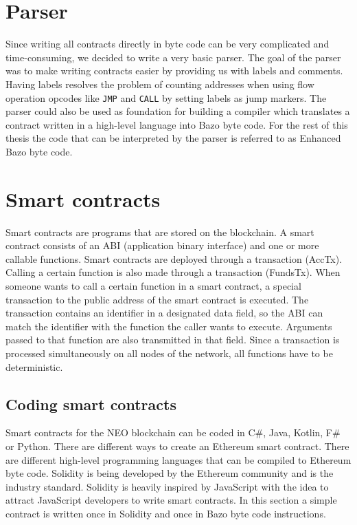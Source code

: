 \section{Parser}
Since writing all contracts directly in byte code can be very complicated and time-consuming, we decided to write a very basic parser. The goal of the parser was to make writing contracts easier by providing us with labels and comments. Having labels resolves the problem of counting addresses when using flow operation opcodes like \texttt{JMP} and \texttt{CALL} by setting labels as jump markers. The parser could also be used as foundation for building a compiler which translates a contract written in a high-level language into Bazo byte code. For the rest of this thesis the code that can be interpreted by the parser is referred to as \flqq Enhanced Bazo byte code\frqq.

\section{Smart contracts}
Smart contracts are programs that are stored on the blockchain. A smart contract consists of an ABI (application binary interface) and one or more callable functions. Smart contracts are deployed through a transaction (AccTx). Calling a certain function is also made through a transaction (FundsTx). When someone wants to call a certain function in a smart contract, a special transaction to the public address of the smart contract is executed. The transaction contains an identifier in a designated data field, so the ABI can match the identifier with the function the caller wants to execute. Arguments passed to that function are also transmitted in that field. Since a transaction is processed simultaneously on all nodes of the network, all functions have to be deterministic.

\subsection{Coding smart contracts}
Smart contracts for the NEO blockchain can be coded in C\#, Java, Kotlin, F\# or Python. There are different ways to create an Ethereum smart contract. There are different high-level programming languages that can be compiled to Ethereum byte code. Solidity is being developed by the Ethereum community and is the industry standard. Solidity is heavily inspired by JavaScript with the idea to attract JavaScript developers to write smart contracts. In this section a simple contract is written once in Solidity and once in Bazo byte code instructions.

